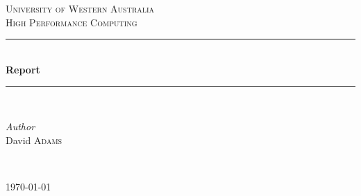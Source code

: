 \documentclass[12pt]{article}
\begin{document}
 

\begin{titlepage} %
	\newcommand{\HRule}{\rule{\linewidth}{0.5mm}} %
	
	\center %
	
	
	\textsc{\LARGE University of Western Australia}\\[1.5cm] %
	
	
	\textsc{\large High Performance Computing}\\[0.5cm] %
	
	
	\HRule\\[0.4cm]
	
	{\huge\bfseries Report}\\[0.4cm] %
	
	\HRule\\[1.5cm]
	
	
	\begin{minipage}{0.4\textwidth}
		\begin{flushleft}
			\large
			\textit{Author}\\
			David \textsc{Adams} %
		\end{flushleft}
	\end{minipage}
	~

	

\vspace{18 mm}
	
	{\large\today} %
	

\end{titlepage}
\end{document}
